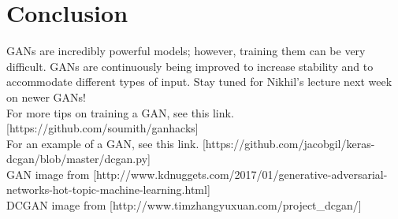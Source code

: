\documentclass{article}
\begin{document}
\section{Conclusion}
    GANs are incredibly powerful models; however, training them can be very difficult. GANs are continuously being improved to increase stability and to accommodate different types of input. Stay tuned for Nikhil's lecture next week on newer GANs! \\
    For more tips on training a GAN, see this link. [https://github.com/soumith/ganhacks]\\
    For an example of a GAN, see this link. [https://github.com/jacobgil/keras-dcgan/blob/master/dcgan.py]\\
    GAN image from [http://www.kdnuggets.com/2017/01/generative-adversarial-networks-hot-topic-machine-learning.html]\\
    DCGAN image from [http://www.timzhangyuxuan.com/project\_dcgan/]
    
\end{document}
